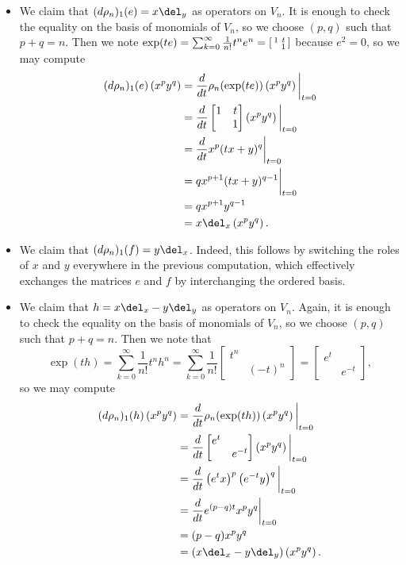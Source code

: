 \documentclass[../notes.tex]{subfiles}
\begin{document}
\begin{itemize}
	\item We claim that $(d\rho_n)_1(e)=x\del_y$ as operators on $V_n$. It is enough to check the equality on the basis of monomials of $V_n$, so we choose $(p,q)$ such that $p+q=n$. Then we note $\exp(te)=\sum_{k=0}^\infty\frac1{n!}t^ne^n=\begin{bsmallmatrix}
		1 & t \\ & 1
	\end{bsmallmatrix}$ because $e^2=0$, so we may compute
	\begin{align*}
		(d\rho_n)_1(e)\left(x^py^q\right) &= \frac d{dt}\rho_n(\exp(te))\left(x^py^q\right)\bigg|_{t=0} \\
		&= \frac d{dt}\begin{bmatrix}
			1 & t \\ & 1
		\end{bmatrix}\left(x^py^q\right)\bigg|_{t=0} \\
		&= \frac d{dt}x^p(tx+y)^q\bigg|_{t=0} \\
		&= qx^{p+1}(tx+y)^{q-1}\bigg|_{t=0} \\
		&= qx^{p+1}y^{q-1} \\
		&= x\del_x\left(x^py^q\right).
	\end{align*}
	\item We claim that $(d\rho_n)_1(f)=y\del_x$. Indeed, this follows by switching the roles of $x$ and $y$ everywhere in the previous computation, which effectively exchanges the matrices $e$ and $f$ by interchanging the ordered basis.
	\item We claim that $h=x\del_x-y\del_y$ as operators on $V_n$. Again, it is enough to check the equality on the basis of monomials of $V_n$, so we choose $(p,q)$ such that $p+q=n$. Then we note that
	\[\exp(th)=\sum_{k=0}^\infty\frac1{n!}t^nh^n=\sum_{k=0}^\infty\frac1{n!}\begin{bmatrix}
		t^n \\ & (-t)^n
	\end{bmatrix}=\begin{bmatrix}
		e^t \\ & e^{-t}
	\end{bmatrix},\]
	so we may compute
	\begin{align*}
		(d\rho_n)_1(h)\left(x^py^q\right) &= \frac d{dt}\rho_n(\exp(th))\left(x^py^q\right)\bigg|_{t=0} \\
		&= \frac d{dt}\begin{bmatrix}
			e^t \\ & e^{-t}
		\end{bmatrix}\left(x^py^q\right)\bigg|_{t=0} \\
		&= \frac d{dt}\left(e^tx\right)^p\left(e^{-t}y\right)^q\bigg|_{t=0} \\
		&= \frac d{dt}e^{(p-q)t}x^py^q\bigg|_{t=0} \\
		&= (p-q)x^py^q \\
		&= (x\del_x-y\del_y)\left(x^py^q\right).
	\end{align*}
\end{itemize}
\end{document}

